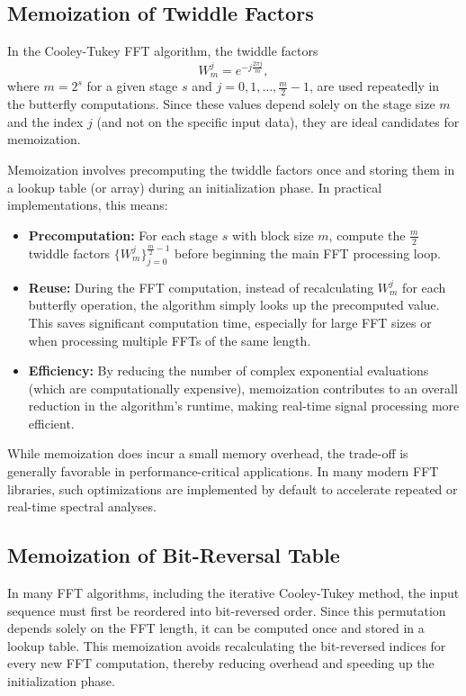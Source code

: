 \documentclass[12pt,letter]{article}
\begin{document}
\subsection{Memoization of Twiddle Factors}

In the Cooley-Tukey FFT algorithm, the twiddle factors
\[
W_m^j = e^{-j\frac{2\pi j}{m}},
\]
where \( m = 2^s \) for a given stage \( s \) and
\( j = 0, 1, \ldots, \frac{m}{2}-1 \), are used repeatedly in the butterfly
computations. Since these values depend solely on the stage size \( m \) and
the index \( j \) (and not on the specific input data), they are ideal
candidates for memoization.

Memoization involves precomputing the twiddle factors once and storing them
in a lookup table (or array) during an initialization phase. In practical
implementations, this means:
\begin{itemize}
  \item \textbf{Precomputation:} For each stage \( s \) with block size
  \( m \), compute the \( \frac{m}{2} \) twiddle factors
  \( \{W_m^j\}_{j=0}^{\frac{m}{2}-1} \) before beginning the main FFT
  processing loop.
  \item \textbf{Reuse:} During the FFT computation, instead of recalculating
  \( W_m^j \) for each butterfly operation, the algorithm simply looks up the
  precomputed value. This saves significant computation time, especially for
  large FFT sizes or when processing multiple FFTs of the same length.
  \item \textbf{Efficiency:} By reducing the number of complex exponential
  evaluations (which are computationally expensive), memoization contributes
  to an overall reduction in the algorithm's runtime, making real-time signal
  processing more efficient.
\end{itemize}

While memoization does incur a small memory overhead, the trade-off is
generally favorable in performance-critical applications. In many modern FFT
libraries, such optimizations are implemented by default to accelerate
repeated or real-time spectral analyses.

\subsection{Memoization of Bit-Reversal Table}

In many FFT algorithms, including the iterative Cooley-Tukey method, the input
sequence must first be reordered into bit-reversed order. Since this
permutation depends solely on the FFT length, it can be computed once and
stored in a lookup table. This memoization avoids recalculating the
bit-reversed indices for every new FFT computation, thereby reducing overhead
and speeding up the initialization phase.
\end{document}
